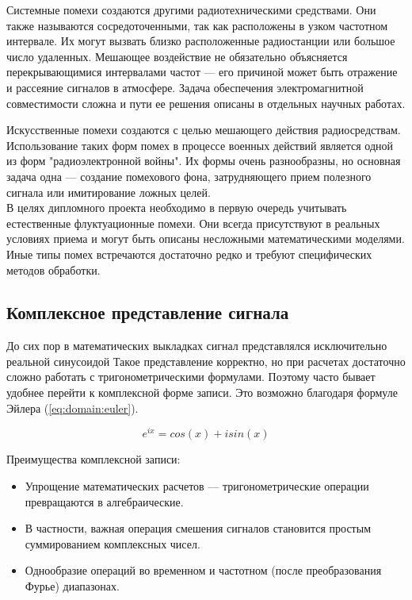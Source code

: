 Системные помехи создаются другими радиотехническими средствами. Они также называются сосредоточенными, так как расположены в узком частотном интервале. Их могут вызвать близко расположенные радиостанции или большое число удаленных. Мешающее воздействие не обязательно объясняется перекрывающимися интервалами частот --- его причиной может быть отражение и рассеяние сигналов в атмосфере. Задача обеспечения электромагнитной совместимости сложна и пути ее решения описаны в отдельных научных работах.

Искусственные помехи создаются с целью мешающего действия радиосредствам. Использование таких форм помех в процессе военных действий является одной из форм "радиоэлектронной войны". Их формы очень разнообразны, но основная задача одна --- создание помехового фона, затрудняющего прием полезного сигнала или имитирование ложных целей.
\\

В целях дипломного проекта необходимо в первую очередь учитывать естественные флуктуационные помехи. Они всегда присутствуют в реальных условиях приема и могут быть описаны несложными математическими моделями. Иные типы помех встречаются достаточно редко и требуют специфических методов обработки.


\subsection{Комплексное представление сигнала}

До сих пор в математических выкладках сигнал представлялся исключительно реальной синусоидой Такое представление корректно, но при расчетах достаточно сложно работать с тригонометрическими формулами. Поэтому часто бывает удобнее перейти к комплексной форме записи. Это возможно благодаря формуле Эйлера (\autoref{eq:domain:euler}).

\begin{equation}
  \label{eq:domain:euler}
  e^{ix} = cos(x) + isin(x)
\end{equation}

Преимущества комплексной записи:
\begin{itemize}
  \item Упрощение математических расчетов --- тригонометрические операции превращаются в алгебраические.
  \item В частности, важная операция смешения сигналов становится простым суммированием комплексных чисел.
  \item Однообразие операций во временном и частотном (после преобразования Фурье) диапазонах.
\end{itemize}

